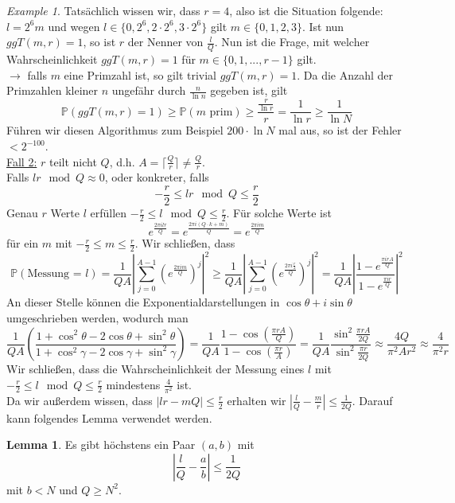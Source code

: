 \documentclass[a4paper, 12pt]{article}
\theoremstyle{plain}
\theoremstyle{definition}
\theoremstyle{lemma}
\newtheorem{lemma}[theorem]{Lemma}
\theoremstyle{remark}
\theoremstyle{example}
\newtheorem{example}[theorem]{Example}
\begin{document}
\begin{example}
		Tatsächlich wissen wir, dass $r=4$, also ist die Situation folgende: $l = 2^6m$ und wegen $l \in \{0, 2^6, 2\cdot 2^6, 3\cdot 2^6\}$ gilt $m \in \{0,1,2,3\}$. Ist nun $ggT(m,r) = 1$, so ist $r$ der Nenner von $\frac{l}{Q}$. Nun ist die Frage, mit welcher Wahrscheinlichkeit $ggT(m,r) = 1$ für $m \in \{0,1,...,r-1\}$ gilt.\\
		$\rightarrow$ falls $m$ eine Primzahl ist, so gilt trivial $ggT(m,r) = 1$. Da die Anzahl der Primzahlen kleiner $n$ ungefähr durch $\frac{n}{\ln n}$ gegeben ist, gilt \[\mathbb{P}(ggT(m,r) = 1) \geq \mathbb{P}(m \text{ prim}) \geq \frac{\frac{r}{\ln r}}{r} = \frac{1}{\ln r} \geq \frac{1}{\ln N}\] Führen wir diesen Algorithmus zum Beispiel $200\cdot \ln N$ mal aus, so ist der Fehler $<2^{-100}$.\\
		\underline{Fall 2:} $r$ teilt nicht $Q$, d.h. $A = \lceil \frac{Q}{r}\rceil \neq \frac{Q}{r}$.\\
		Falls $lr \mod Q \approx 0$, oder konkreter, falls \[-\frac{r}{2} \leq lr \mod Q \leq \frac{r}{2}\]
		Genau $r$ Werte $l$ erfüllen $-\frac{r}{2} \leq l \mod Q \leq \frac{r}{2}$. Für solche Werte ist $$e^{\frac{2\pi i l r }{Q}} = e^{\frac{2\pi i(Q\cdot k + m)}{Q}} = e^{\frac{2\pi i m}{Q}}$$ für ein $m$ mit $-\frac{r}{2} \leq m \leq \frac{r}{2}$. Wir schließen, dass \[\mathbb{P}(\text{Messung = }l) = \frac{1}{QA}\left|\sum_{j=0}^{A-1}\left(e^{\frac{2\pi i m}{Q}}\right)^j\right|^2 \geq \frac{1}{QA} \left|\sum_{j=0}^{A-1}\left(e^{\frac{2\pi i \frac{r}{2}}{Q}}\right)^j\right|^2 = \frac{1}{QA}\left|\frac{1-e^{\frac{\pi i r A}{Q}}}{1-e^{\frac{\pi i r}{Q}}}\right|^2\]
		An dieser Stelle können die Exponentialdarstellungen in $\cos \theta + i \sin \theta$ umgeschrieben werden, wodurch man \[\frac{1}{QA}\left(\frac{1+\cos^2 \theta - 2\cos \theta + \sin^2 \theta}{1 + \cos^2 \gamma - 2\cos \gamma + \sin^2 \gamma}\right) = \frac{1}{QA} \frac{1-\cos\left(\frac{\pi r A}{Q}\right)}{1 - \cos \left(\frac{\pi r}{A}\right)} = \frac{1}{QA}\frac{\sin^2 \frac{\pi r A}{2Q}}{\sin^2 \frac{\pi r}{2 Q}} \approx \frac{4Q}{\pi^2Ar^2} \approx \frac{4}{\pi^2 r}\]
		Wir schließen, dass die Wahrscheinlichkeit der Messung eines $l$ mit $-\frac{r}{2} \leq l \mod Q \leq \frac{r}{2}$ mindestens $\frac{4}{\pi^2}$ ist.\\
		Da wir außerdem wissen, dass $\left|lr-mQ\right|\leq \frac{r}{2}$ erhalten wir $\left|\frac{l}{Q} - \frac{m}{r}\right| \leq \frac{1}{2Q}$. Darauf kann folgendes Lemma verwendet werden.
		\begin{lemma}
			Es gibt höchstens ein Paar $(a,b)$ mit \[\left|\frac{l}{Q} - \frac{a}{b}\right| \leq \frac{1}{2Q}\] mit $b<N$ und $Q\geq N^2$.

\end{lemma}
\end{example}
\end{document}
